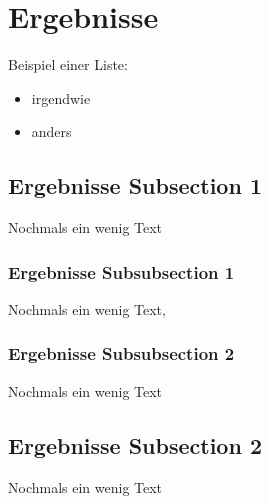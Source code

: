 
\section{Ergebnisse}

Beispiel einer Liste:

\begin{itemize} 
	\item irgendwie 
	\item anders
\end{itemize}


\subsection{Ergebnisse Subsection 1}
Nochmals ein wenig Text

\subsubsection{Ergebnisse Subsubsection 1}
Nochmals ein wenig Text‚

\subsubsection{Ergebnisse Subsubsection 2}
Nochmals ein wenig Text

\subsection{Ergebnisse Subsection 2}
Nochmals ein wenig Text